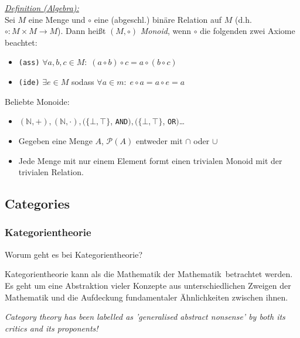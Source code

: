 \documentclass{beamer}
\begin{document}
\begin{frame}
\underline{\emph{Definition (Algebra):}}\\ Sei $M$ eine Menge und $\circ$ eine (abgeschl.) binäre Relation auf $M$ (d.h. $\circ : M \times M \to M$). Dann heißt $(M, \circ)$ \emph{Monoid}, wenn $\circ$ die folgenden zwei Axiome beachtet:

\begin{itemize}
\pause \item \texttt{(ass)} $\forall a,b,c \in M:\; (a \circ b) \circ c = a \circ (b \circ c)$
\pause \item \texttt{(ide)} $\exists e \in M$ sodass $\forall a \in m:\; e \circ a = a \circ e = a$
\end{itemize}
\pause\bigskip

Beliebte Monoide:
\begin{itemize}
\pause \item $(\mathbb{N}, +), (\mathbb{N}, \cdot), (\{\bot, \top\}$, \texttt{AND}$), (\{\bot, \top\}$, \texttt{OR}$)$\dots
\pause \item Gegeben eine Menge $A$, $\mathcal{P}(A)$ entweder mit $\cap$ oder $\cup$
\pause \item Jede Menge mit nur einem Element formt einen trivialen Monoid mit der trivialen Relation.
\end{itemize}

\end{frame}

\subsection*{Categories}

\begin{frame}
\frametitle{Kategorientheorie}

Worum geht es bei Kategorientheorie?
\pause\bigskip

Kategorientheorie kann als die \glqq Mathematik der Mathematik\grqq\ betrachtet werden. Es geht um eine
Abstraktion vieler Konzepte aus unterschiedlichen Zweigen der Mathematik und die Aufdeckung fundamentaler
Ähnlichkeiten zwischen ihnen.
\pause\bigskip

\textit{\glqq Category theory has been labelled as 'generalised abstract nonsense' by both its critics and 
its proponents!\grqq}
\end{frame}

\end{document}
